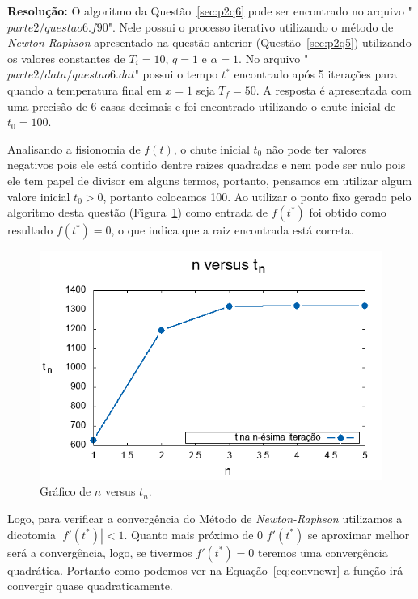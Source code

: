 \documentclass[12pt]{article}
\begin{document}
\textbf{Resolução:}
O algoritmo da Questão~\ref{sec:p2q6} pode ser encontrado no arquivo "$\textit{parte2/questao6.f90}$". Nele possui o processo iterativo utilizando o método de \textit{Newton-Raphson} apresentado na questão anterior (Questão~\ref{sec:p2q5}) utilizando os valores constantes de $T_{i} = 10$, $q = 1$ e $\alpha = 1$. No arquivo "$\textit{parte2/data/questao6.dat}$" possui o tempo $t^{*}$ encontrado após 5 iterações para quando a temperatura final em $x = 1$ seja $T_{f} = 50$. A resposta é apresentada com uma precisão de 6 casas decimais e foi encontrado utilizando o chute inicial de $t_{0} = 100$.

Analisando a fisionomia de $f(t)$, o chute inicial $t_{0}$ não pode ter valores negativos pois ele está contido dentre raizes quadradas e nem pode ser nulo pois ele tem papel de divisor em alguns termos, portanto, pensamos em utilizar algum valore inicial $t_{0} > 0$, portanto colocamos 100. Ao utilizar o ponto fixo gerado pelo algoritmo desta questão (Figura~\ref{fig:p2q6g1}) como entrada de $f(t^{*})$ foi obtido como resultado $f(t^{*}) = 0$, o que indica que a raiz encontrada está correta.

\begin{figure}[H]
	\centering
	\includegraphics[width=1\textwidth]{p2q6g1.png}
	\caption{Gráfico de $n$ versus $t_{n}$.}
	\label{fig:p2q6g1}
\end{figure}

Logo, para verificar a convergência do Método de \textit{Newton-Raphson} utilizamos a dicotomia $\left| f'(t^{*}) \right| < 1$. Quanto mais próximo de 0  $f'(t^{*})$ se aproximar melhor será a convergência, logo, se tivermos $f'(t^{*}) = 0$ teremos uma convergência quadrática. Portanto como podemos ver na Equação~\ref{eq:convnewr} a função irá convergir quase quadraticamente.
\end{document}

